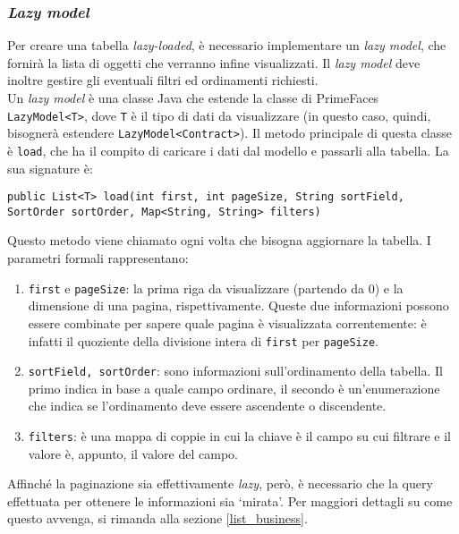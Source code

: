 \subsubsection{\textit{Lazy model}}
Per creare una tabella \textit{lazy-loaded}, è necessario implementare un \textit{lazy model}, che fornirà la lista di oggetti che verranno infine visualizzati. Il \textit{lazy model} deve inoltre gestire gli eventuali filtri ed ordinamenti richiesti.\\
Un \textit{lazy model} è una classe Java che estende la classe di PrimeFaces \lstinline{LazyModel<T>}, dove \texttt{T} è il tipo di dati da visualizzare (in questo caso, quindi, bisognerà estendere \lstinline{LazyModel<Contract>}). Il metodo principale di questa classe è \lstinline{load}, che ha il compito di caricare i dati dal modello e passarli alla tabella. La sua signature è:

\begin{lstlisting}
public List<T> load(int first, int pageSize, String sortField, SortOrder sortOrder, Map<String, String> filters)
\end{lstlisting}

Questo metodo viene chiamato ogni volta che bisogna aggiornare la tabella. I parametri formali rappresentano:

\begin{enumerate}
\item \texttt{first} e \texttt{pageSize}: la prima riga da visualizzare (partendo da 0) e la dimensione di una pagina, rispettivamente. Queste due informazioni possono essere combinate per sapere quale pagina è visualizzata correntemente: è infatti il quoziente della divisione intera di \texttt{first} per \texttt{pageSize}.
\item \texttt{sortField, sortOrder}: sono informazioni sull'ordinamento della tabella. Il primo indica in base a quale campo ordinare, il secondo è un'enumerazione che indica se l'ordinamento deve essere ascendente o discendente.
\item \texttt{filters}: è una mappa di coppie in cui la chiave è il campo su cui filtrare e il valore è, appunto, il valore del campo.
\end{enumerate}

Affinché la paginazione sia effettivamente \textit{lazy}, però, è necessario che la query effettuata per ottenere le informazioni sia \textquoteleft mirata\textquoteright{}. Per maggiori dettagli su come questo avvenga, si rimanda alla sezione \ref{list_business}.

